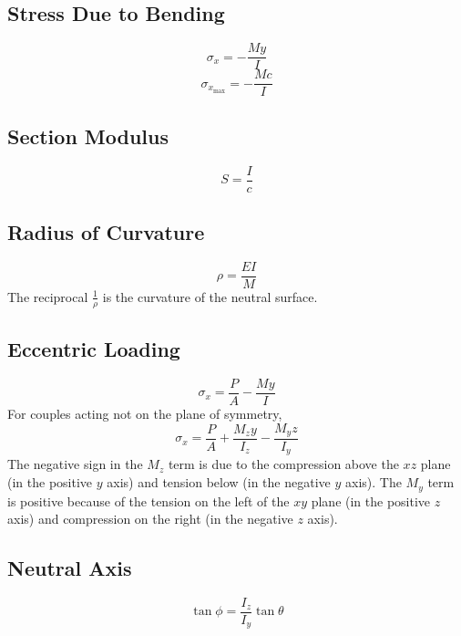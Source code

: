 \documentclass[twoside]{article}
\begin{document}
	\subsection{Stress Due to Bending}
	
	\begin{equation}
		\sigma_x = -\frac{My}{I}
		\label{eq:BendingStress}
	\end{equation}
	\begin{equation}
		\sigma_{x_\text{max}} = -\frac{Mc}{I}
		\label{eq:BendingStressMax}
	\end{equation}
	
	\subsection{Section Modulus}
	
	\begin{equation}
		S = \frac{I}{c}
		\label{eq:SectionModulus}
	\end{equation}
	
	\subsection{Radius of Curvature}
	
	\begin{equation}
		\rho = \frac{EI}{M}
		\label{eq:RadiusOfCurvature}
	\end{equation}
	The reciprocal $\frac{1}{\rho}$ is the curvature of the neutral surface.
	
	\subsection{Eccentric Loading}
	
	\begin{equation}
		\sigma_x = \frac{P}{A}-\frac{My}{I}
		\label{eq:EccentricLoading}
	\end{equation}
	For couples acting not on the plane of symmetry,
	\begin{equation}
		\sigma_x = \frac{P}{A}+\frac{M_z y}{I_z}-\frac{M_y z}{I_y}
		\label{eq:EccentricLoadingGeneral}
	\end{equation}
	The negative sign in the $M_z$ term is due to the compression above the $xz$ plane (in the positive $y$ axis) and tension below (in the negative $y$ axis). The $M_y$ term is positive because of the tension on the left of the $xy$ plane (in the positive $z$ axis) and compression on the right (in the negative $z$ axis).
	
	\subsection{Neutral Axis}
	
	\begin{equation}
		\tan \phi = \frac{I_z}{I_y} \tan \theta
		\label{eq:NeutralAxisAngle}
	\end{equation}
	
\end{document}
